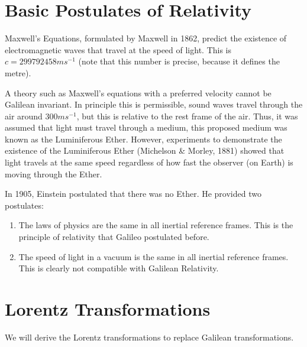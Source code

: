 \documentclass[../Main.tex]{subfiles}
\begin{document}
\section{Basic Postulates of Relativity}
Maxwell's Equations, formulated by Maxwell in 1862, predict the existence of electromagnetic waves that travel at the speed of light. This is $c = 299792458 m s^{-1}$ (note that this number is precise, because it defines the metre).\par
A theory such as Maxwell's equations with a preferred velocity cannot be Galilean invariant. In principle this is permissible, sound waves travel through the air around $300 ms^{-1}$, but this is relative to the rest frame of the air. Thus, it was assumed that light must travel through a medium, this proposed medium was known as the Luminiferous Ether. However, experiments to demonstrate the existence of the Luminiferous Ether (Michelson \& Morley, 1881) showed that light travels at the same speed regardless of how fast the observer (on Earth) is moving through the Ether.\par
In 1905, Einstein postulated that there was no Ether. He provided two postulates:
\begin{enumerate}
    \item The laws of physics are the same in all inertial reference frames. This is the principle of relativity that Galileo postulated before.
    \item The speed of light in a vacuum is the same in all inertial reference frames. This is clearly not compatible with Galilean Relativity.
\end{enumerate}
\section{Lorentz Transformations}
We will derive the Lorentz transformations to replace Galilean transformations.\par
\end{document}
